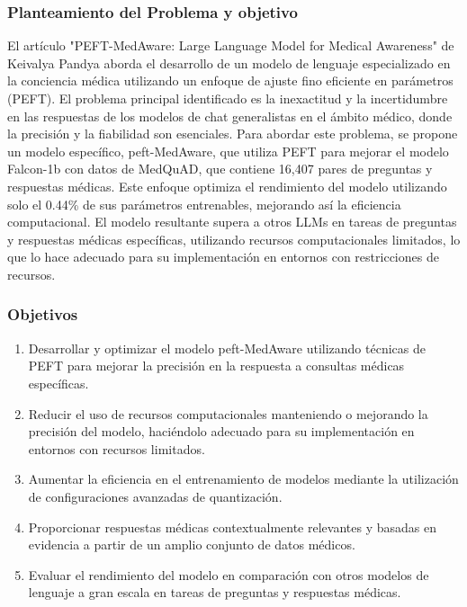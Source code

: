 		\subsubsection{Planteamiento del Problema y objetivo}
				El artículo "PEFT-MedAware: Large Language Model for Medical Awareness" de Keivalya Pandya aborda el desarrollo de un modelo de lenguaje especializado en la conciencia médica utilizando un enfoque de ajuste fino eficiente en parámetros (PEFT). El problema principal identificado es la inexactitud y la incertidumbre en las respuestas de los modelos de chat generalistas en el ámbito médico, donde la precisión y la fiabilidad son esenciales. Para abordar este problema, se propone un modelo específico, peft-MedAware, que utiliza PEFT para mejorar el modelo Falcon-1b con datos de MedQuAD, que contiene 16,407 pares de preguntas y respuestas médicas. Este enfoque optimiza el rendimiento del modelo utilizando solo el 0.44\% de sus parámetros entrenables, mejorando así la eficiencia computacional. El modelo resultante supera a otros LLMs en tareas de preguntas y respuestas médicas específicas, utilizando recursos computacionales limitados, lo que lo hace adecuado para su implementación en entornos con restricciones de recursos.
		
	\subsubsection{Objetivos}
		\begin{enumerate}
			\item Desarrollar y optimizar el modelo peft-MedAware utilizando técnicas de PEFT para mejorar la precisión en la respuesta a consultas médicas específicas.
			
			\item Reducir el uso de recursos computacionales manteniendo o mejorando la precisión del modelo, haciéndolo adecuado para su implementación en entornos con recursos limitados.
			
			\item Aumentar la eficiencia en el entrenamiento de modelos mediante la utilización de configuraciones avanzadas de quantización.
			
			\item Proporcionar respuestas médicas contextualmente relevantes y basadas en evidencia a partir de un amplio conjunto de datos médicos.
			
			\item Evaluar el rendimiento del modelo en comparación con otros modelos de lenguaje a gran escala en tareas de preguntas y respuestas médicas.
		\end{enumerate}
		
